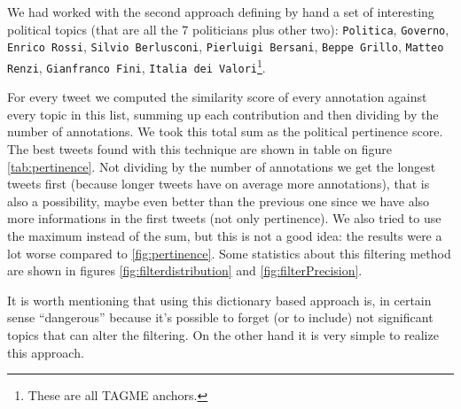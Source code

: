 \documentclass[a4paper,11pt,oneside]{article}
\begin{document}
We had worked with the second approach defining by hand a set of interesting political topics (that are all the 7 politicians plus other two): \texttt{Politica}, \texttt{Governo}, \texttt{Enrico Rossi}, \texttt{Silvio Berlusconi}, \texttt{Pierluigi Bersani}, \texttt{Beppe Grillo}, \texttt{Matteo Renzi}, \texttt{Gianfranco Fini}, \texttt{Italia dei Valori}\footnote{These are all TAGME anchors.}.

For every tweet we computed the similarity score of every annotation against every topic in this list, summing up each contribution and then dividing by the number of annotations. We took this total sum as the political pertinence score. The best tweets found with this technique are shown in table on figure \ref{tab:pertinence}.
Not dividing by the number of annotations we get the longest tweets first (because longer tweets have on average more annotations), that is also a possibility, maybe even better than the previous one since we have also more informations in the first tweets (not only pertinence). We also tried to use the maximum instead of the sum, but this is not a good idea: the results were a lot worse compared to \ref{fig:pertinence}. Some statistics about this filtering method are shown in figures \ref{fig:filterdistribution} and \ref{fig:filterPrecision}.

It is worth mentioning that using this dictionary based approach is, in certain sense ``dangerous'' because it's possible to forget (or to include) not significant topics that can alter the filtering. On the other hand it is very simple to realize this approach.
\end{document}
